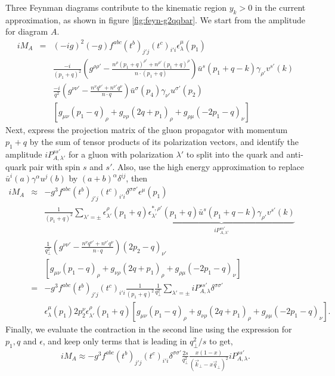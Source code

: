 Three Feynman diagrams contribute to the kinematic region $y_k >0$ in the current approximation, as shown in figure \ref{fig:feyn-g2qqbar}.
We start from the amplitude for diagram $A$.
\begin{eqnarray}
i M_A &=& (-ig)^2(-g)f^{abc}(t^b)_{j'j}(t^c)_{i'i} \epsilon_\lambda^\mu(p_1) \\\nonumber
&&\frac{-i}{(p_1+q)^2}\left(g^{\rho\rho'}-\frac{n^{\rho}(p_1+q)^{\rho'}+n^{\rho'}(p_1+q)^\rho}{n\cdot (p_1+q)}\right) \bar{u}^s(p_1+q-k)\gamma_{\rho'}v^{s'}(k) \\ \nonumber
&&\frac{-i}{q^2}\left(g^{\nu\nu'}-\frac{n^{\nu}q^{\nu'}+n^{\nu'}q^\nu}{n\cdot q}\right) \bar{u}^{\sigma}(p_4)\gamma_{\nu'}u^{\sigma'}(p_2) \\ \nonumber
&& \left[g_{\mu\nu}(p_1-q)_\rho + g_{\nu\rho}(2q+p_1)_\rho + g_{\rho\mu}(-2p_1 -q)_\nu \right]
\end{eqnarray}
Next, express the projection matrix of the gluon propagator with momentum $p_1+q$ by the sum of tensor products of its polarization vectors, and identify the amplitude $iP_{A,\lambda'}^{ss'}$ for a gluon with polarization $\lambda'$ to split into the quark and anti-quark pair with spin $s$ and $s'$.
Also, use the high energy approximation to replace $\bar{u}^i(a)\gamma^\alpha u^j(b)$ by $(a+b)^\alpha \delta^{ij}$, then
\begin{eqnarray}
i M_A &\approx& -g^3 f^{abc}(t^b)_{j'j}(t^c)_{i'i} \delta^{\sigma\sigma'} \epsilon^\mu(p_1) \\\nonumber
&&\frac{1}{(p_1+q)^2} \sum_{\lambda'=\pm}\epsilon_{\lambda'}^{\rho}(p_1+q)\underbrace{\epsilon_{\lambda'}^{*,\rho'}(p_1+q) \bar{u}^s(p_1+q-k)\gamma_{\rho'}v^{s'}(k)}_{iP_{A,\lambda'}^{ss'}} \\ \nonumber
&&\frac{1}{q_\perp^2}\left(g^{\nu\nu'}-\frac{n^{\nu}q^{\nu'}+n^{\nu'}q^\nu}{n\cdot q}\right) (2p_2-q)_{\nu'} \\ \nonumber
&& \left[g_{\mu\nu}(p_1-q)_\rho + g_{\nu\rho}(2q+p_1)_\rho + g_{\rho\mu}(-2p_1 -q)_\nu \right] \\
&=& -g^3 f^{abc}(t^b)_{j'j}(t^c)_{i'i} \frac{1}{(p_1+q)^2}\frac{1}{q_\perp^2} \sum_{\lambda'=\pm}iP_{A,\lambda}^{ss'} \delta^{\sigma\sigma'}  \\ \nonumber
&& \epsilon_\lambda^\mu(p_1)2p_2^{\nu} \epsilon_{\lambda'}^{\rho}(p_1+q) \left[g_{\mu\nu}(p_1-q)_\rho + g_{\nu\rho}(2q+p_1)_\rho + g_{\rho\mu}(-2p_1 -q)_\nu \right].
\end{eqnarray}
Finally, we evaluate the contraction in the second line using the expression for $p_1, q$ and $\epsilon$, and keep only terms that is leading in $q_\perp^2/s$ to get,
\begin{eqnarray}
i M_A \approx -g^3 f^{abc}(t^b)_{j'j}(t^c)_{i'i}\delta^{\sigma\sigma'}\frac{2s}{q_\perp^2} \frac{x(1-x)}{(\vec{k}_\perp-x \vec{q}_\perp)^2} iP_{A,\lambda}^{ss'}.
\end{eqnarray}

